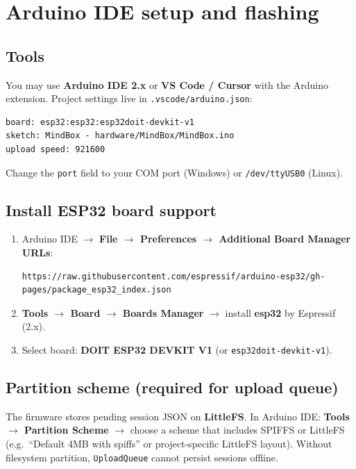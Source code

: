 \documentclass[11pt,a4paper]{report}
\newcommand{\filepath}[1]{\texttt{#1}}
\begin{document}
\chapter{Arduino IDE setup and flashing}
\label{ch:arduino}

\section{Tools}

You may use \textbf{Arduino IDE 2.x} or \textbf{VS Code / Cursor} with the Arduino extension.
Project settings live in \filepath{.vscode/arduino.json}:
\begin{lstlisting}
board: esp32:esp32:esp32doit-devkit-v1
sketch: MindBox - hardware/MindBox/MindBox.ino
upload speed: 921600
\end{lstlisting}
Change the \texttt{port} field to your COM port (Windows) or \texttt{/dev/ttyUSB0} (Linux).

\section{Install ESP32 board support}

\begin{enumerate}[leftmargin=*]
  \item Arduino IDE $\rightarrow$ \textbf{File $\rightarrow$ Preferences $\rightarrow$ Additional Board Manager URLs}:
\begin{lstlisting}
https://raw.githubusercontent.com/espressif/arduino-esp32/gh-pages/package_esp32_index.json
\end{lstlisting}
  \item \textbf{Tools $\rightarrow$ Board $\rightarrow$ Boards Manager} $\rightarrow$ install \textbf{esp32} by Espressif (2.x).
  \item Select board: \textbf{DOIT ESP32 DEVKIT V1} (or \texttt{esp32doit-devkit-v1}).
\end{enumerate}

\section{Partition scheme (required for upload queue)}

The firmware stores pending session JSON on \textbf{LittleFS}. In Arduino IDE:
\textbf{Tools $\rightarrow$ Partition Scheme} $\rightarrow$ choose a scheme that includes
SPIFFS or LittleFS (e.g.\ ``Default 4MB with spiffs'' or project-specific LittleFS layout).
Without filesystem partition, \texttt{UploadQueue} cannot persist sessions offline.
\end{document}
